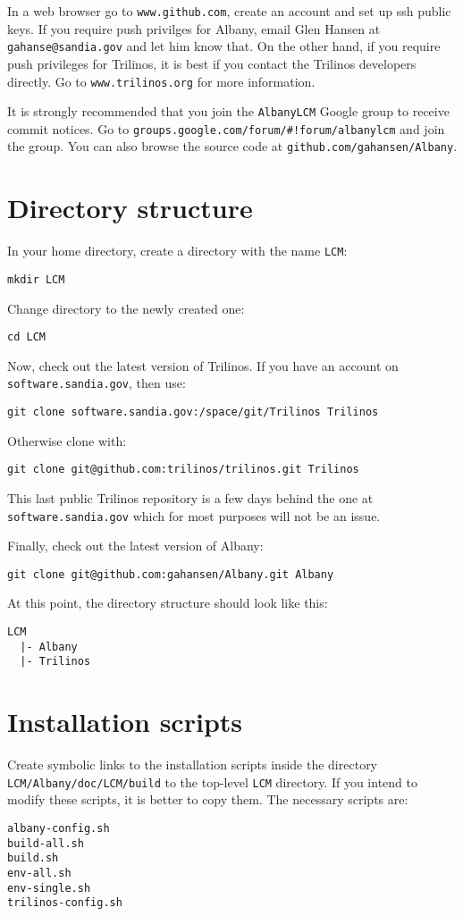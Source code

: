\documentclass[10pt,a4paper]{article} \usepackage[utf8]{inputenc}
\begin{document}
In a web browser go to \verb+www.github.com+, create an account and
set up ssh public keys. If you require push privilges for Albany,
email Glen Hansen at \verb+gahanse@sandia.gov+ and let him know
that. On the other hand, if you require push privileges for Trilinos,
it is best if you contact the Trilinos developers directly. Go to
\verb+www.trilinos.org+ for more information.

It is strongly recommended that you join the \verb+AlbanyLCM+ Google
group to receive commit notices. Go to
\verb+groups.google.com/forum/#!forum/albanylcm+ and join the
group. You can also browse the source code at
\verb+github.com/gahansen/Albany+.

\section{Directory structure}
In your home directory, create a directory with the name \verb+LCM+:
\begin{verbatim}
mkdir LCM
\end{verbatim}

Change directory to the newly created one:
\begin{verbatim}
cd LCM
\end{verbatim}

Now, check out the latest version of Trilinos. If you have an account on
\verb+software.sandia.gov+, then use:
\begin{verbatim}
git clone software.sandia.gov:/space/git/Trilinos Trilinos
\end{verbatim}
Otherwise clone with:
\begin{verbatim}
git clone git@github.com:trilinos/trilinos.git Trilinos
\end{verbatim}
This last public Trilinos repository is a few days behind the one at
\verb+software.sandia.gov+ which for most purposes will not be an issue.

Finally, check out the latest version of Albany:
\begin{verbatim}
git clone git@github.com:gahansen/Albany.git Albany
\end{verbatim}

At this point, the directory structure should look like this:
\begin{verbatim}
LCM
  |- Albany
  |- Trilinos
\end{verbatim}

\section{Installation scripts}
Create symbolic links to the installation scripts inside the directory
\verb+LCM/Albany/doc/LCM/build+ to the top-level \verb+LCM+
directory. If you intend to modify these scripts, it is better to copy
them. The necessary scripts are:
\begin{verbatim}
albany-config.sh
build-all.sh
build.sh
env-all.sh
env-single.sh
trilinos-config.sh
\end{verbatim}
\end{document}

